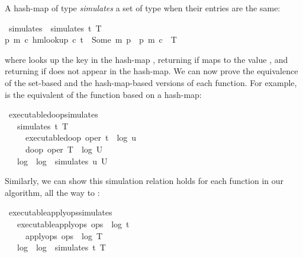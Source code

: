 \documentclass[sigplan,anonymous]{acmart}
\renewenvironment{isabelle}{%
  \medbreak\noindent%
  \renewcommand{\isanewline}{\\}%
  \begin{minipage}{\columnwidth}%
  \begin{isabellebody}%
  \begin{tabbing}%
}{%
  \end{tabbing}%
  \end{isabellebody}%
  \end{minipage}%
  \medbreak%
}
\renewcommand{\isacartoucheopen}{}
\renewcommand{\isacartoucheclose}{}
\begin{document}
A hash-map  of type  \emph{simulates} a set  of type  when their entries are the same:
\begin{isabelle}
\isamarkupfalse%
\ simulates\ \ {\isacartoucheopen}simulates\ t\ T\ {\isasymequiv}\isanewline
{\isacharparenleft}{\isasymforall}p\ m\ c{\isachardot}\ hm{\isachardot}lookup\ c\ t\ {\isacharequal}\ Some\ {\isacharparenleft}m{\isacharcomma}\ p{\isacharparenright}\ {\isasymlongleftrightarrow}\ {\isacharparenleft}p{\isacharcomma}\ m{\isacharcomma}\ c{\isacharparenright}\ {\isasymin}\ T{\isacharparenright}{\isacartoucheclose}
\end{isabelle}
\noindent where  looks up the key  in the hash-map , returning  if  maps to the value , and returning  if  does not appear in the hash-map.
We can now prove the equivalence of the set-based and the hash-map-based versions of each function.
For example,  is the equivalent of the  function based on a hash-map:
\begin{isabelle}
\isamarkupfalse%
\ executable{\isacharunderscore}do{\isacharunderscore}op{\isacharunderscore}simulates{\isacharcolon}\isanewline
\ \ \ {\isacartoucheopen}simulates\ t\ T{\isacartoucheclose}\isanewline
\ \ \ \ \ {\isacartoucheopen}executable{\isacharunderscore}do{\isacharunderscore}op\ {\isacharparenleft}oper{\isacharcomma}\ t{\isacharparenright}\ {\isacharequal}\ {\isacharparenleft}log{}{\isacharcomma}\ u{\isacharparenright}{\isacartoucheclose}\isanewline
\ \ \ \ \ {\isacartoucheopen}do{\isacharunderscore}op\ {\isacharparenleft}oper{\isacharcomma}\ T{\isacharparenright}\ {\isacharequal}\ {\isacharparenleft}log{}{\isacharcomma}\ U{\isacharparenright}{\isacartoucheclose}\isanewline
\ \ \ {\isacartoucheopen}log{}\ {\isacharequal}\ log{}\ {\isasymand}\ simulates\ u\ U{\isacartoucheclose}
\end{isabelle}

Similarly, we can show this simulation relation holds for each function in our algorithm, all the way to :
\begin{isabelle}
\isamarkupfalse%
\ executable{\isacharunderscore}apply{\isacharunderscore}ops{\isacharunderscore}simulates{\isacharcolon}\isanewline
\ \ \ {\isacartoucheopen}executable{\isacharunderscore}apply{\isacharunderscore}ops\ ops\ {\isacharequal}\ {\isacharparenleft}log{}{\isacharcomma}\ t{\isacharparenright}{\isacartoucheclose}\isanewline
\ \ \ \ \ {\isacartoucheopen}apply{\isacharunderscore}ops\ ops\ {\isacharequal}\ {\isacharparenleft}log{}{\isacharcomma}\ T{\isacharparenright}{\isacartoucheclose}\isanewline
\ \ \ {\isacartoucheopen}log{}\ {\isacharequal}\ log{}\ {\isasymand}\ simulates\ t\ T{\isacartoucheclose}
\end{isabelle}
\end{document}
